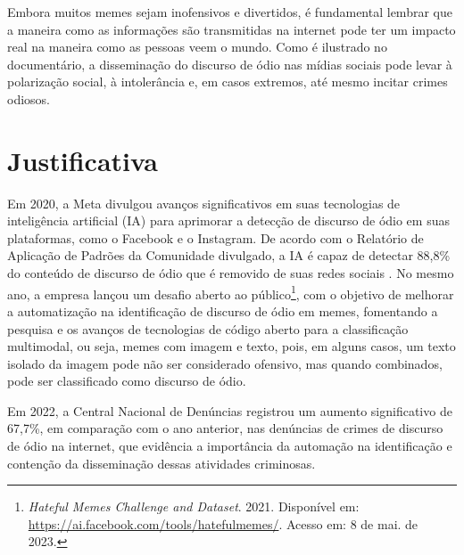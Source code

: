 
Embora muitos memes sejam inofensivos e divertidos, é fundamental lembrar que a maneira como as informações são transmitidas na internet pode ter um impacto real na maneira como as pessoas veem o mundo. Como é ilustrado no documentário, a disseminação do discurso de ódio nas mídias sociais pode levar à polarização social, à intolerância e, em casos extremos, até mesmo incitar crimes odiosos.

\section{Justificativa}


Em 2020, a Meta divulgou avanços significativos em suas tecnologias de inteligência artificial (IA) para aprimorar a detecção de discurso de ódio em suas plataformas, como o Facebook e o Instagram. De acordo com o Relatório de Aplicação de Padrões da Comunidade divulgado, a IA é capaz de detectar 88,8\% do conteúdo de discurso de ódio que é removido de suas redes sociais \cite{MetaAIAdvances2020}. No mesmo ano, a empresa lançou um desafio aberto ao público\footnote{\textit{Hateful Memes Challenge and Dataset}. 2021. Disponível em: \url{https://ai.facebook.com/tools/hatefulmemes/}. Acesso em: 8 de mai. de 2023.}, com o objetivo de melhorar a automatização na identificação de discurso de ódio em memes, fomentando a pesquisa e os avanços de tecnologias de código aberto para a classificação multimodal, ou seja, memes com imagem e texto, pois, em alguns casos, um texto isolado da imagem pode não ser considerado ofensivo, mas quando combinados, pode ser classificado como discurso de ódio.

Em 2022, a Central Nacional de Denúncias \cite{Safernet2022} registrou um aumento significativo de 67,7\%, em comparação com o ano anterior, nas denúncias de crimes de discurso de ódio na internet, que evidência a importância da automação na identificação e contenção da disseminação dessas atividades criminosas.

